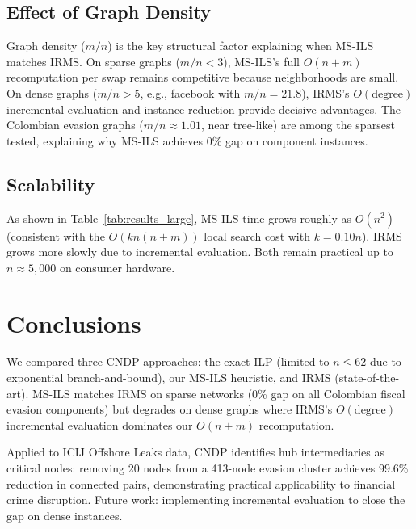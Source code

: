\documentclass[11pt,a4paper]{article}
\begin{document}
\subsection{Effect of Graph Density}

Graph density ($m/n$) is the key structural factor explaining when MS-ILS matches IRMS. On sparse graphs ($m/n < 3$), MS-ILS's full $O(n+m)$ recomputation per swap remains competitive because neighborhoods are small. On dense graphs ($m/n > 5$, e.g., facebook with $m/n = 21.8$), IRMS's $O(\text{degree})$ incremental evaluation and instance reduction provide decisive advantages. The Colombian evasion graphs ($m/n \approx 1.01$, near tree-like) are among the sparsest tested, explaining why MS-ILS achieves 0\% gap on component instances.

\subsection{Scalability}

As shown in Table~\ref{tab:results_large}, MS-ILS time grows roughly as $O(n^2)$ (consistent with the $O(kn(n+m))$ local search cost with $k = 0.10n$). IRMS grows more slowly due to incremental evaluation. Both remain practical up to $n \approx 5{,}000$ on consumer hardware.

\section{Conclusions}

We compared three CNDP approaches: the exact ILP (limited to $n \leq 62$ due to exponential branch-and-bound), our MS-ILS heuristic, and IRMS (state-of-the-art). MS-ILS matches IRMS on sparse networks (0\% gap on all Colombian fiscal evasion components) but degrades on dense graphs where IRMS's $O(\text{degree})$ incremental evaluation dominates our $O(n+m)$ recomputation.

Applied to ICIJ Offshore Leaks data, CNDP identifies hub intermediaries as critical nodes: removing 20 nodes from a 413-node evasion cluster achieves 99.6\% reduction in connected pairs, demonstrating practical applicability to financial crime disruption. Future work: implementing incremental evaluation to close the gap on dense instances.
\end{document}
